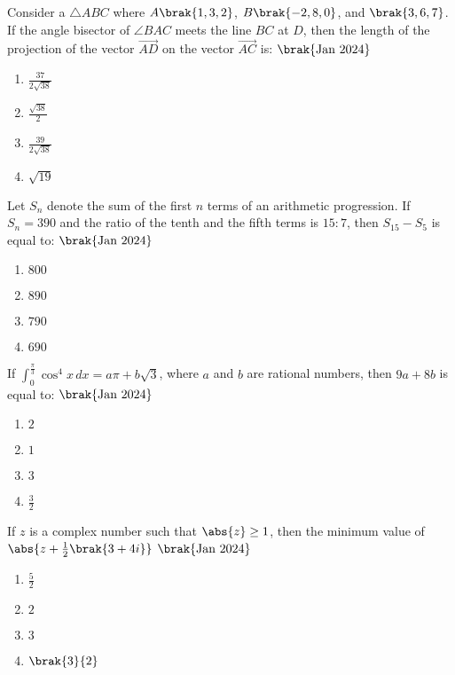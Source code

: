\item{
Consider a $\triangle ABC$ where $A\brak{1,3,2}$, $B\brak{-2,8,0}$, and $\brak{3,6,7}$. If the angle bisector of $\angle BAC$ meets the line $BC$ at $D$, then the length of the projection of the vector $\overrightarrow{AD}$ on the vector $\overrightarrow{AC}$ is:
\hfill{$\brak{\text{Jan 2024}}$}
\begin{multicols}{4}
\begin{enumerate}
\item $\frac{37}{2\sqrt{38}}$
\item $\frac{\sqrt{38}}{2}$
\item $\frac{39}{2\sqrt{38}}$
\item $\sqrt{19}$
\end{enumerate}
\end{multicols}
}
\item{
Let $S_n$ denote the sum of the first $n$ terms of an arithmetic progression. If $S_n=390$ and the ratio of the tenth and the fifth terms is $15:7$, then $S_{15}-S_5$ is equal to:
\hfill{$\brak{\text{Jan 2024}}$}
\begin{multicols}{4}
\begin{enumerate}
\item $800$
\item $890$
\item $790$
\item $690$
\end{enumerate}
\end{multicols}
}
\item{
If $\int_{0}^{\frac{\pi}{3}}\cos^4x\,dx=a\pi+b\sqrt{3}$, where $a$ and $b$ are rational numbers, then $9a+8b$ is equal to:
\hfill{$\brak{\text{Jan 2024}}$}
\begin{multicols}{4}
\begin{enumerate}
\item $2$
\item $1$
\item $3$
\item $\frac{3}{2}$
\end{enumerate}
\end{multicols}
}
\item{
If $z$ is a complex number such that $\abs{z}\geq 1$, then the minimum value of $\abs{z+\frac{1}{2}\brak{3+4i}}$
\hfill{$\brak{\text{Jan 2024}}$}
\begin{multicols}{4}
\begin{enumerate}
\item $\frac{5}{2}$
\item $2$
\item $3$
\item $\brak{3}{2}$
\end{enumerate}
\end{multicols}
}
